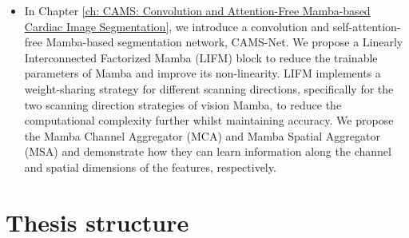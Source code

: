 \begin{itemize}
    \item In Chapter \ref{ch: CAMS: Convolution and Attention-Free Mamba-based Cardiac Image Segmentation}, we introduce a convolution and self-attention-free Mamba-based segmentation network, CAMS-Net. We propose a Linearly Interconnected Factorized Mamba (LIFM) block to reduce the trainable parameters of Mamba and improve its non-linearity. LIFM implements a weight-sharing strategy for different scanning directions, specifically for the two scanning direction strategies of vision Mamba, to reduce the computational complexity further whilst maintaining accuracy. We propose the Mamba Channel Aggregator (MCA) and Mamba Spatial Aggregator (MSA) and demonstrate how they can learn information along the channel and spatial dimensions of the features, respectively.
    
\end{itemize}

\clearpage

\section{Thesis structure}

